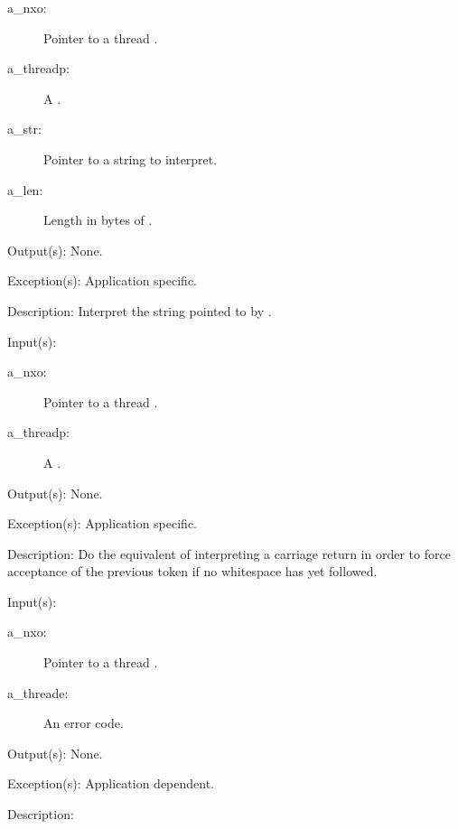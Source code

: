 \begin{capi}
\begin{capilist}
\begin{description}
		\item[a\_nxo: ]
			Pointer to a thread .
		\item[a\_threadp: ]
			A .
		\item[a\_str: ]
			Pointer to a string to interpret.
		\item[a\_len: ]
			Length in bytes of .
		\end{description}
	\item[Output(s): ] None.
	\item[Exception(s): ] Application specific.
	\item[Description: ]
		Interpret the string pointed to by .
	\end{capilist}
\label{nxo_thread_flush}
	\begin{capilist}
	\item[Input(s): ]
		\begin{description}\item[]
		\item[a\_nxo: ]
			Pointer to a thread .
		\item[a\_threadp: ]
			A .
		\end{description}
	\item[Output(s): ] None.
	\item[Exception(s): ] Application specific.
	\item[Description: ]
		Do the equivalent of interpreting a carriage return in order to
		force acceptance of the previous token if no whitespace has yet
		followed.
	\end{capilist}
\label{nxo_thread_error}
	\begin{capilist}
	\item[Input(s): ]
		\begin{description}\item[]
		\item[a\_nxo: ]
			Pointer to a thread \classname{nxo}.
		\item[a\_threade: ]
			An error code.
		\end{description}
	\item[Output(s): ] None.
	\item[Exception(s): ] Application dependent.
	\item[Description: ]

\end{capilist}
\end{capi}
